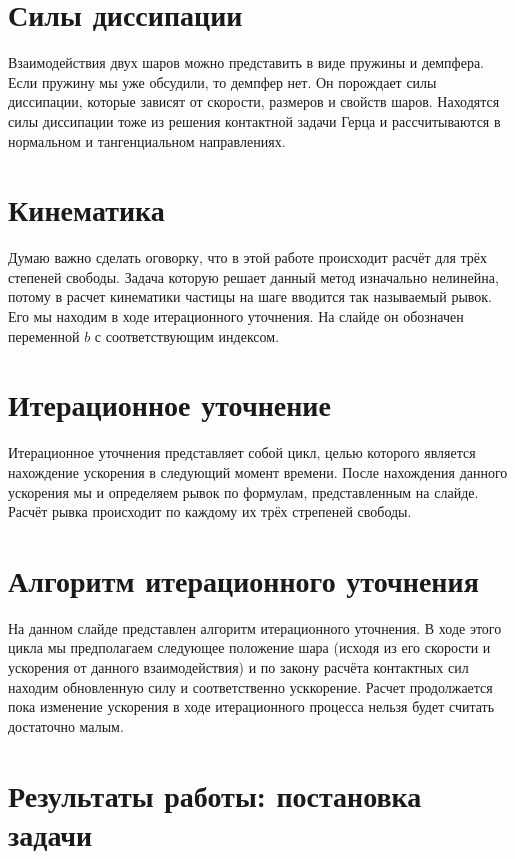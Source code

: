 \documentclass[a4paper]{article}
\begin{document}
\section{Силы диссипации}

Взаимодействия двух шаров можно представить в виде пружины и демпфера.
Если пружину мы уже обсудили, то демпфер нет.
Он порождает силы диссипации, которые зависят от скорости, размеров и свойств шаров.
Находятся силы диссипации тоже из решения контактной задачи Герца и рассчитываются в нормальном и тангенциальном направлениях.

\section{Кинематика}

Думаю важно сделать оговорку, что в этой работе происходит расчёт для трёх степеней свободы.
Задача которую решает данный метод изначально нелинейна, потому в расчет кинематики частицы на шаге вводится так называемый рывок.
Его мы находим в ходе итерационного уточнения.
На слайде он обозначен переменной $b$ с соответствующим индексом.

\section{Итерационное уточнение}

Итерационное уточнения представляет собой цикл, целью которого является нахождение ускорения в следующий момент времени.
После нахождения данного ускорения мы и определяем рывок по формулам, представленным на слайде.
Расчёт рывка происходит по каждому их трёх стрепеней свободы.

\section{Алгоритм итерационного уточнения}

На данном слайде представлен алгоритм итерационного уточнения.
В ходе этого цикла мы предполагаем следующее положение шара (исходя из его скорости и ускорения от данного взаимодействия) и по закону расчёта контактных сил находим обновленную силу и соответственно усккорение.
Расчет продолжается пока изменение ускорения в ходе итерационного процесса нельзя будет считать достаточно малым.

\section{Результаты работы: постановка задачи}
\end{document}
